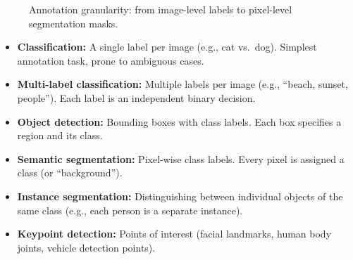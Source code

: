 \begin{figure}[htbp]
    \centering
    \caption{Annotation granularity: from image-level labels to pixel-level segmentation masks.}
    \label{fig:annotation_types}
\end{figure}

\begin{itemize}
    \item \textbf{Classification:} A single label per image (e.g., cat vs.\ dog). Simplest annotation task, prone to ambiguous cases.
    \item \textbf{Multi-label classification:} Multiple labels per image (e.g., ``beach, sunset, people''). Each label is an independent binary decision.
    \item \textbf{Object detection:} Bounding boxes with class labels. Each box specifies a region and its class.
    \item \textbf{Semantic segmentation:} Pixel-wise class labels. Every pixel is assigned a class (or ``background'').
    \item \textbf{Instance segmentation:} Distinguishing between individual objects of the same class (e.g., each person is a separate instance).
    \item \textbf{Keypoint detection:} Points of interest (facial landmarks, human body joints, vehicle detection points).
\end{itemize}

